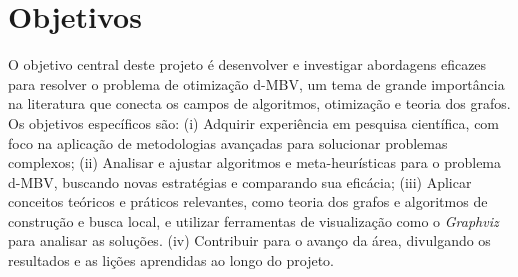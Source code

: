 
\section{Objetivos}
\label{sec-objetivos}

O objetivo central deste projeto é desenvolver e investigar abordagens eficazes para resolver o problema de otimização d-MBV, um tema de grande importância na literatura que conecta os campos de algoritmos, otimização e teoria dos grafos. Os objetivos específicos são: (i) Adquirir experiência em pesquisa científica, com foco na aplicação de metodologias avançadas para solucionar problemas complexos; (ii) Analisar e ajustar algoritmos e meta-heurísticas para o problema d-MBV, buscando novas estratégias e comparando sua eficácia; (iii) Aplicar conceitos teóricos e práticos relevantes, como teoria dos grafos e algoritmos de construção e busca local, e utilizar ferramentas de visualização como o \textit{Graphviz} para analisar as soluções. (iv) Contribuir para o avanço da área, divulgando os resultados e as lições aprendidas ao longo do projeto.